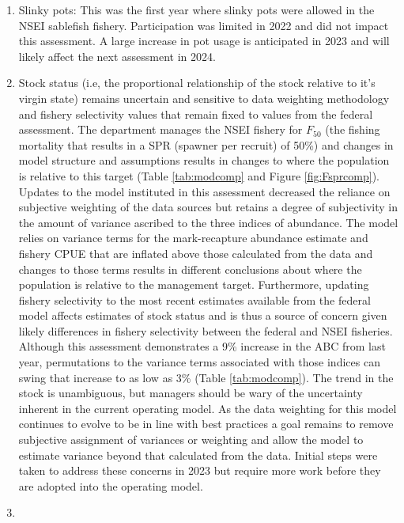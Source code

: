 \documentclass[
]{article}
\providecommand{\tightlist}{%
  \setlength{\itemsep}{0pt}\setlength{\parskip}{0pt}}
\begin{document}
\begin{enumerate}
\def\labelenumi{\arabic{enumi}.}
\tightlist
\item
  {Slinky pots:} This was the first year where slinky pots were allowed in the NSEI sablefish fishery. Participation was limited in 2022 and did not impact this assessment. A large increase in pot usage is anticipated in 2023 and will likely affect the next assessment in 2024.\\
\item
  Stock status (i.e, the proportional relationship of the stock relative to it's virgin state) remains uncertain and sensitive to data weighting methodology and fishery selectivity values that remain fixed to values from the federal assessment. The department manages the NSEI fishery for \(F_{50}\) (the fishing mortality that results in a SPR (spawner per recruit) of 50\%) and changes in model structure and assumptions results in changes to where the population is relative to this target (Table \ref{tab:modcomp} and Figure \ref{fig:Fsprcomp}). Updates to the model instituted in this assessment decreased the reliance on subjective weighting of the data sources but retains a degree of subjectivity in the amount of variance ascribed to the three indices of abundance. The model relies on variance terms for the mark-recapture abundance estimate and fishery CPUE that are inflated above those calculated from the data and changes to those terms results in different conclusions about where the population is relative to the management target. Furthermore, updating fishery selectivity to the most recent estimates available from the federal model affects estimates of stock status and is thus a source of concern given likely differences in fishery selectivity between the federal and NSEI fisheries. Although this assessment demonstrates a 9\% increase in the ABC from last year, permutations to the variance terms associated with those indices can swing that increase to as low as 3\% (Table \ref{tab:modcomp}). The trend in the stock is unambiguous, but managers should be wary of the uncertainty inherent in the current operating model. As the data weighting for this model continues to evolve to be in line with best practices a goal remains to remove subjective assignment of variances or weighting and allow the model to estimate variance beyond that calculated from the data. Initial steps were taken to address these concerns in 2023 but require more work before they are adopted into the operating model.
\item

\end{enumerate}
\end{document}
